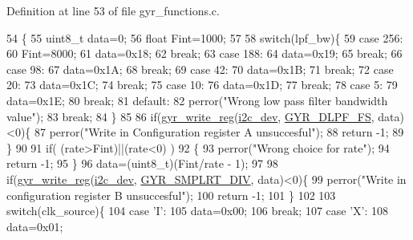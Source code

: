 Definition at line 53 of file gyr\-\_\-functions.\-c.


\begin{DoxyCode}
54 \{ 
55   uint8\_t data=0;
56   \textcolor{keywordtype}{float} Fint=1000;
57 
58   \textcolor{keywordflow}{switch}(lpf\_bw)\{
59     \textcolor{keywordflow}{case} 256:
60       Fint=8000;
61       data=0x18;
62       \textcolor{keywordflow}{break};
63     \textcolor{keywordflow}{case} 188:
64       data=0x19;
65       \textcolor{keywordflow}{break};
66     \textcolor{keywordflow}{case} 98:
67       data=0x1A;
68       \textcolor{keywordflow}{break};
69     \textcolor{keywordflow}{case} 42:
70       data=0x1B;
71       \textcolor{keywordflow}{break};
72     \textcolor{keywordflow}{case} 20:
73       data=0x1C;
74       \textcolor{keywordflow}{break};
75     \textcolor{keywordflow}{case} 10:
76       data=0x1D;
77       \textcolor{keywordflow}{break};
78     \textcolor{keywordflow}{case} 5:
79       data=0x1E;
80       \textcolor{keywordflow}{break};
81     \textcolor{keywordflow}{default}:
82       perror(\textcolor{stringliteral}{"Wrong low pass filter bandwidth value"});
83       \textcolor{keywordflow}{break};
84   \}
85   
86   \textcolor{keywordflow}{if}(\hyperlink{group__gyr_ga3eba167b8ab0614bfe7bafeae8b5570d}{gyr\_write\_reg}(\hyperlink{CommunicationV0_2communication_8c_a7751bd45ac1064efb35adf1f19c25db8}{i2c\_dev}, \hyperlink{communication_2imu__regs_8h_a78908b66de8b46d12895e7cb66af6f5c}{GYR\_DLPF\_FS}, data)<0)\{
87     perror(\textcolor{stringliteral}{"Write in Configuration register A unsuccesful"});
88     \textcolor{keywordflow}{return} -1;
89   \}
90 
91   \textcolor{keywordflow}{if}( (rate>Fint)||(rate<0) )
92   \{
93     perror(\textcolor{stringliteral}{"Wrong choice for rate"});
94     \textcolor{keywordflow}{return} -1;
95   \}
96   data=(uint8\_t)(Fint/rate - 1);
97   
98   \textcolor{keywordflow}{if}(\hyperlink{group__gyr_ga3eba167b8ab0614bfe7bafeae8b5570d}{gyr\_write\_reg}(\hyperlink{CommunicationV0_2communication_8c_a7751bd45ac1064efb35adf1f19c25db8}{i2c\_dev}, \hyperlink{communication_2imu__regs_8h_a04a18568e6e39825c98be5ec2976bec4}{GYR\_SMPLRT\_DIV}, data)<0)\{
99     perror(\textcolor{stringliteral}{"Write in configuration register B unsuccesful"});
100     \textcolor{keywordflow}{return} -1;
101   \}
102       
103   \textcolor{keywordflow}{switch}(clk\_source)\{
104     \textcolor{keywordflow}{case} \textcolor{charliteral}{'I'}:
105       data=0x00;
106       \textcolor{keywordflow}{break};
107     \textcolor{keywordflow}{case} \textcolor{charliteral}{'X'}:
108       data=0x01;

\end{DoxyCode}
